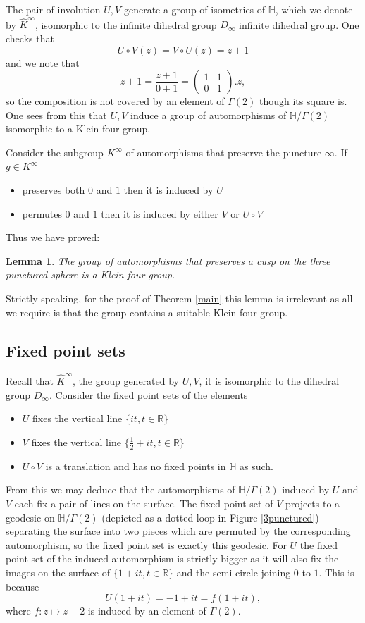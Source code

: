 \documentclass[12pt,a4paper]{amsart}
\newtheorem{lem}[thm]{Lemma}
\def\HH{\mathbb{H}}
\def\xx{\HH/g2}
\def\RR{\mathbb{R}}
\def\g2{\Gamma(2)}
\def\xx{\HH/\g2}
\begin{document}
The pair of involution $U,V$ generate a group 
of isometries of $\HH$,  which we denote by $\hat{K}^\infty$, 
 isomorphic to the infinite dihedral group $D_\infty$
infinite dihedral group. One checks that 
$$U\circ V (z) = V \circ U (z) = z + 1$$
and we note that 
$$  z + 1 = \frac{z+ 1}{ 0 + 1} = \begin{pmatrix}
1 & 1 \\ 0 & 1
\end{pmatrix}. z,$$
so the composition is not covered  by an element of $\g2$ though its square is.
One sees  from this that 
$U,V$ induce a  group of automorphisms of $\xx$ isomorphic to  a Klein four group.

Consider the subgroup $K^\infty$ of automorphisms that 
preserve the puncture $\infty$.
 If $g\in K^\infty$
\begin{itemize}
\item  preserves both  $0$ and $ 1$ then it is induced by $U$
\item  permutes  $0$ and $ 1$ then it is induced by either  $V$  or $U\circ V$
\end{itemize}

Thus we have proved:

\begin{lem}
The group of automorphisms that preserves a cusp 
on the three punctured sphere is a Klein four group.
\end{lem}

Strictly speaking, for the proof of Theorem \ref{main} this lemma is irrelevant 
as all we require is that the group contains a suitable Klein four group.


\subsection{Fixed point sets }

Recall that  $\hat{K}^\infty$,  the group generated by $U,V$,
it is isomorphic to the dihedral group $D_\infty$.
Consider the fixed point sets of the elements
\begin{itemize}
\item $U$ fixes the  vertical line $\{ it, t \in \RR \} $
\item $V$ fixes the vertical line $\{ \frac{1}{2} +  it , t \in \RR \} $
\item $U\circ V$  is a translation and has no fixed points in $\HH$ as such.
\end{itemize}
From this we may deduce that the automorphisms of $\xx$ induced by $U$ and $V$ 
each fix a pair of lines on the surface. 
The fixed point set of  $V$ projects 
to a geodesic on $\xx$ (depicted as a dotted loop in Figure \ref{3punctured})
separating the surface
 into  two pieces which are permuted by 
the corresponding automorphism,
so the fixed point set is exactly this geodesic.
For $U$ the fixed point set of the induced automorphism  is strictly bigger 
as it will also fix  the images on the surface of 
$\{1+  it, t \in \RR \} $ and the semi circle joining $0$ to $1$.
This is because 
$$U(1+  it) = - 1+  it = f(1+  it),$$
where $f: z \mapsto z - 2$ is induced by an element of $\g2$.
\end{document}
